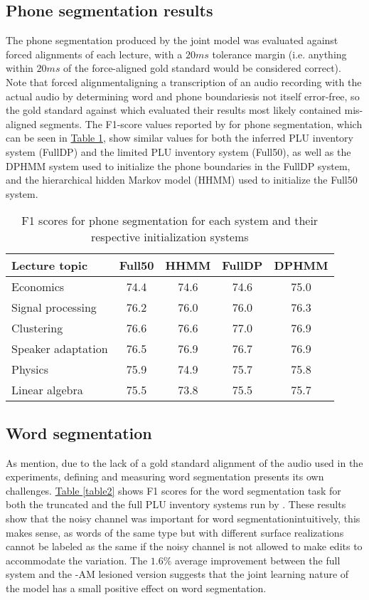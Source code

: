 \documentclass[12pt,letterpaper]{article}
\begin{document}
\subsection{Phone segmentation results}
The phone segmentation produced by the joint model was evaluated against forced alignments of each lecture, with a $20ms$ tolerance margin (i.e. anything within $20ms$ of the force-aligned gold standard would be considered correct). Note that forced alignment\textemdash aligning a transcription of an audio recording with the actual audio by determining word and phone boundaries\textemdash is not itself error-free, so the gold standard against which \citet{lee:2015} evaluated their results most likely contained mis-aligned segments. The F1-score values reported by \citet{lee:2015} for phone segmentation, which can be seen in \hyperref[table1]{Table \ref*{table1}}, show similar values for both the inferred PLU inventory system (FullDP) and the limited PLU inventory system (Full50), as well as the DPHMM system used to initialize the phone boundaries in the FullDP system, and the hierarchical hidden Markov model (HHMM) used to initialize the Full50 system. 
\begin{table}
\begin{tabular}{|l|c|c||c|c|}
\hline
Lecture topic&Full50&HHMM&FullDP&DPHMM\\
\hline \hline
Economics&74.4&74.6&74.6&75.0\\
\hline
Signal processing&76.2&76.0&76.0&76.3\\
\hline
Clustering&76.6&76.6&77.0&76.9\\
\hline
Speaker adaptation&76.5&76.9&76.7&76.9\\
\hline
Physics&75.9&74.9&75.7&75.8\\
\hline
Linear algebra&75.5&73.8&75.5&75.7\\
\hline

\end{tabular}
\caption{F1 scores for phone segmentation for each system and their respective initialization systems \protect\citep{lee:2015}}
\label{table1}
\end{table}

\subsection{Word segmentation}
As \citet{lee:2015} mention, due to the lack of a gold standard alignment of the audio used in the experiments, defining and measuring word segmentation presents its own challenges.  \hyperref[table2]{Table \ref*{table2}} shows F1 scores for the word segmentation task for both the truncated and the full PLU inventory systems run by \citet{lee:2015}. These results show that the noisy channel was important for word segmentation\textemdash intuitively, this makes sense, as words of the same type but with different surface realizations cannot be labeled as the same if the noisy channel is not allowed to make edits to accommodate the variation. The $1.6\%$ average improvement between the full system and the -AM lesioned version suggests that the joint learning nature of the model has a small positive effect on word segmentation.
\end{document}

